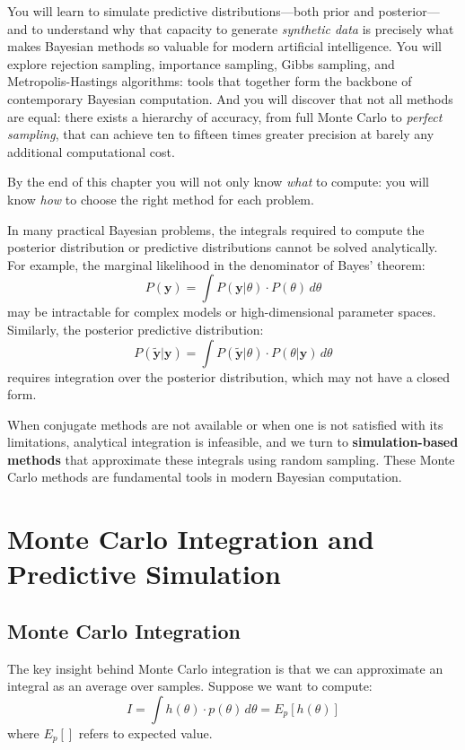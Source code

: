 You will learn to simulate predictive distributions---both prior and posterior---and to understand why that capacity to generate \emph{synthetic data} is precisely what makes Bayesian methods so valuable for modern artificial intelligence. You will explore rejection sampling, importance sampling, Gibbs sampling, and Metropolis-Hastings algorithms: tools that together form the backbone of contemporary Bayesian computation. And you will discover that not all methods are equal: there exists a hierarchy of accuracy, from full Monte Carlo to \emph{perfect sampling}, that can achieve ten to fifteen times greater precision at barely any additional computational cost.

By the end of this chapter you will not only know \emph{what} to compute: you will know \emph{how} to choose the right method for each problem.

In many practical Bayesian problems, the integrals required to compute the posterior distribution or predictive distributions cannot be solved analytically. For example, the marginal likelihood in the denominator of Bayes' theorem:
\begin{equation}
P(\mathbf{y}) = \int P(\mathbf{y}|\theta) \cdot P(\theta) \, d\theta
\end{equation}
may be intractable for complex models or high-dimensional parameter spaces. Similarly, the posterior predictive distribution:
\begin{equation}
P(\tilde{\mathbf{y}}|\mathbf{y}) = \int P(\tilde{\mathbf{y}}|\theta) \cdot P(\theta|\mathbf{y}) \, d\theta
\end{equation}
requires integration over the posterior distribution, which may not have a closed form.

When conjugate methods are not available or when one is not satisfied with its limitations, analytical integration is infeasible, and we turn to \textbf{simulation-based methods} that approximate these integrals using random sampling. These Monte Carlo methods are fundamental tools in modern Bayesian computation.

\section{Monte Carlo Integration and Predictive Simulation}

\subsection{Monte Carlo Integration}
The key insight behind Monte Carlo integration is that we can approximate an integral as an average over samples. Suppose we want to compute:
\begin{equation}
I = \int h(\theta) \cdot p(\theta) \, d\theta = E_p[h(\theta)]
\end{equation}
where $E_p[]$ refers to expected value.

